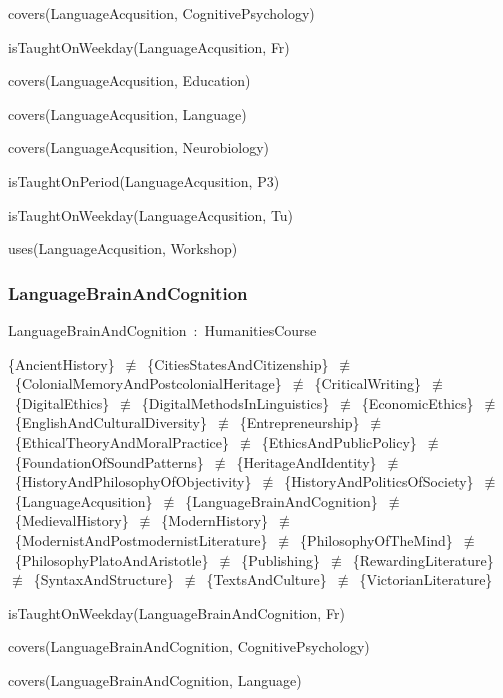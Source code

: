 \documentclass{article}
\begin{document}
covers(LanguageAcqusition, CognitivePsychology)

isTaughtOnWeekday(LanguageAcqusition, Fr)

covers(LanguageAcqusition, Education)

covers(LanguageAcqusition, Language)

covers(LanguageAcqusition, Neurobiology)

isTaughtOnPeriod(LanguageAcqusition, P3)

isTaughtOnWeekday(LanguageAcqusition, Tu)

uses(LanguageAcqusition, Workshop)

\subsubsection*{LanguageBrainAndCognition}

LanguageBrainAndCognition~:~HumanitiesCourse

\{AncientHistory\}~\ensuremath{\not\equiv}~\{CitiesStatesAndCitizenship\}~\ensuremath{\not\equiv}~\{ColonialMemoryAndPostcolonialHeritage\}~\ensuremath{\not\equiv}~\{CriticalWriting\}~\ensuremath{\not\equiv}~\{DigitalEthics\}~\ensuremath{\not\equiv}~\{DigitalMethodsInLinguistics\}~\ensuremath{\not\equiv}~\{EconomicEthics\}~\ensuremath{\not\equiv}~\{EnglishAndCulturalDiversity\}~\ensuremath{\not\equiv}~\{Entrepreneurship\}~\ensuremath{\not\equiv}~\{EthicalTheoryAndMoralPractice\}~\ensuremath{\not\equiv}~\{EthicsAndPublicPolicy\}~\ensuremath{\not\equiv}~\{FoundationOfSoundPatterns\}~\ensuremath{\not\equiv}~\{HeritageAndIdentity\}~\ensuremath{\not\equiv}~\{HistoryAndPhilosophyOfObjectivity\}~\ensuremath{\not\equiv}~\{HistoryAndPoliticsOfSociety\}~\ensuremath{\not\equiv}~\{LanguageAcqusition\}~\ensuremath{\not\equiv}~\{LanguageBrainAndCognition\}~\ensuremath{\not\equiv}~\{MedievalHistory\}~\ensuremath{\not\equiv}~\{ModernHistory\}~\ensuremath{\not\equiv}~\{ModernistAndPostmodernistLiterature\}~\ensuremath{\not\equiv}~\{PhilosophyOfTheMind\}~\ensuremath{\not\equiv}~\{PhilosophyPlatoAndAristotle\}~\ensuremath{\not\equiv}~\{Publishing\}~\ensuremath{\not\equiv}~\{RewardingLiterature\}~\ensuremath{\not\equiv}~\{SyntaxAndStructure\}~\ensuremath{\not\equiv}~\{TextsAndCulture\}~\ensuremath{\not\equiv}~\{VictorianLiterature\}

isTaughtOnWeekday(LanguageBrainAndCognition, Fr)

covers(LanguageBrainAndCognition, CognitivePsychology)

covers(LanguageBrainAndCognition, Language)
\end{document}
